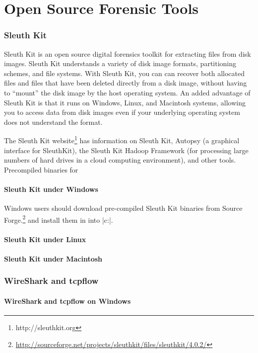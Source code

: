 \chapter{Open Source Forensic Tools}

\subsection{Sleuth Kit}

Sleuth Kit is an open source digital forensics toolkit for extracting
files from disk images. Sleuth Kit understands a variety of disk image
formats, partitioning schemes, and file systems. With Sleuth Kit, you can can recover
both allocated files and files that have been deleted directly from a
disk image, without having to ``mount'' the disk image by the host
operating system. An added advantage of Sleuth Kit is that it runs on
Windows, Linux, and Macintosh systems, allowing you to access data
from disk images even if your underlying operating system does not
understand the format.

The Sleuth Kit website\footnote{http://sleuthkit.org} has information
on Sleuth Kit, Autopsy (a graphical interface for SleuthKit), the
Sleuth Kit Hadoop Framework (for processing large numbers of hard
drives in a cloud computing environment), and other tools. 
Precompiled binaries for

\subsubsection{Sleuth Kit under Windows}
Windows users should download pre-compiled Sleuth Kit binaries from Source
Forge.\footnote{\url{http://sourceforge.net/projects/sleuthkit/files/sleuthkit/4.0.2/}}
and install them in into |c:\sleuthkit|.

\subsubsection{Sleuth Kit under Linux}

\subsubsection{Sleuth Kit under Macintosh}

\subsection{WireShark and tcpflow}

\subsubsection{WireShark and tcpflow on Windows}
